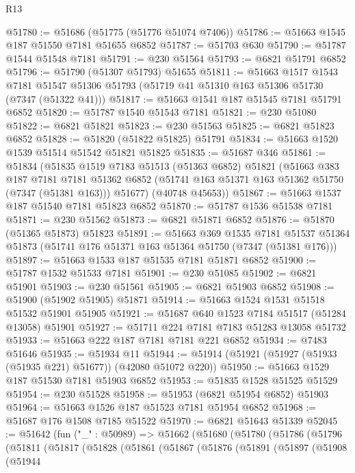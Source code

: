 \begin{lexlean}{R13}
\begin{coremodule}
@51780 := @51686 (@51775 (@51776 @51074 @7406))
@51786 := @51663 @1545 @187 @51550 @7181 @51655 @6852
@51787 := @51703 @630
@51790 := @51787 @1544 @51548 @7181
@51791 := @230 @51564
@51793 := @6821 @51791 @6852
@51796 := @51790 (@51307 @51793) @51655
@51811 := @51663
    @1517
    @1543
    @7181
    @51547
    @51306
    @51793
    (@51719 @41 @51310 @163 @51306 @51730 (@7347 (@51322 @41)))
@51817 := @51663 @1541 @187 @51545 @7181 @51791 @6852
@51820 := @51787 @1540 @51543 @7181
@51821 := @230 @51080
@51822 := @6821 @51821
@51823 := @230 @51563
@51825 := @6821 @51823 @6852
@51828 := @51820 (@51822 @51825) @51791
@51834 := @51663 @1520 @1539 @51514 @51542 @51821 @51825
@51835 := @51687 @346
@51861 := @51834
    (@51835
      @1519
      @7183
      @51513
      (@51363 @6852)
      @51821
      (@51663
        @383
        @187
        @7181
        @7181
        @51362
        @6852
        (@51741 @163 @51371 @163 @51362 @51750 (@7347 (@51381 @163)))
        @51677)
      (@40748 @45653))
@51867 := @51663 @1537 @187 @51540 @7181 @51823 @6852
@51870 := @51787 @1536 @51538 @7181
@51871 := @230 @51562
@51873 := @6821 @51871 @6852
@51876 := @51870 (@51365 @51873) @51823
@51891 := @51663
    @369
    @1535
    @7181
    @51537
    @51364
    @51873
    (@51741 @176 @51371 @163 @51364 @51750 (@7347 (@51381 @176)))
@51897 := @51663 @1533 @187 @51535 @7181 @51871 @6852
@51900 := @51787 @1532 @51533 @7181
@51901 := @230 @51085
@51902 := @6821 @51901
@51903 := @230 @51561
@51905 := @6821 @51903 @6852
@51908 := @51900 (@51902 @51905) @51871
@51914 := @51663 @1524 @1531 @51518 @51532 @51901 @51905
@51921 := @51687 @640 @1523 @7184 @51517 (@51284 @13058) @51901
@51927 := @51711 @224 @7181 @7183 @51283 @13058 @51732
@51933 := @51663 @222 @187 @7181 @7181 @221 @6852
@51934 := @7483 @51646
@51935 := @51934 @11
@51944 := @51914 (@51921 (@51927 (@51933 (@51935 @221) @51677)) (@42080 @51072 @220))
@51950 := @51663 @1529 @187 @51530 @7181 @51903 @6852
@51953 := @51835 @1528 @51525 @51529
@51954 := @230 @51528
@51958 := @51953 (@6821 @51954 @6852) @51903
@51964 := @51663 @1526 @187 @51523 @7181 @51954 @6852
@51968 := @51687 @176 @1508 @7185 @51522
@51970 := @6821 @51643 @51339
@52045 := @51642
    (fun ("_" : @50989) =>
    @51662
      (@51680
        (@51780
          (@51786
            (@51796
              (@51811
                (@51817
                  (@51828
                    (@51861
                      (@51867
                        (@51876
                          (@51891
                            (@51897
                              (@51908
                                (@51944

\end{coremodule}
\end{lexlean}
